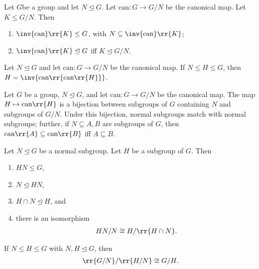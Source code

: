 \documentclass{article}
\begin{document}
\begin{proposition}
  Let $G$be a group and let $N\trianglelefteq G$. Let $\text{can}:G\to G/N$ be the canonical
  map. Let $K\leq G/N$. Then
  \begin{enumerate}
    \item $\inv{\text{can}}\rr{K}\leq G$, with $N\subseteq\inv{\text{can}}\rr{K}$;
    \item $\inv{\text{can}}\rr{K}\trianglelefteq G$ iff $K\trianglelefteq G/N$.
  \end{enumerate}
\end{proposition}

\begin{proposition}
  Let $N\trianglelefteq G$ and let $\text{can}:G\to G/N$ be the canonical map. If $N\leq H\leq G$,
  then $H=\inv{\text{can}\rr{\text{can}\rr{H}}}$.
\end{proposition}

\begin{theorem}[Correspondence]
  \label{thm:correspondence}
  Let $G$ be a group, $N\trianglelefteq G$, and let $\text{can}:G\to G/N$ be the canonical map.
  The map $H\mapsto\text{can}\rr{H}$ is a bijection between subgroups of $G$ containing $N$ and
  subgroups of $G/N$. Under this bijection, normal subgroups match with normal subgroups; further,
  if $N\subseteq A,B$ are subgroups of $G$, then $\text{can}\rr{A}\subseteq\text{can}\rr{B}$
  iff $A\subseteq B$.
\end{theorem}

\begin{theorem}
  \label{thm:second-iso-theorem}
  Let $N\trianglelefteq G$ be a normal subgroup. Let $H$ be a subgroup of $G$. Then
  \begin{enumerate}
    \item $HN\leq G$,
    \item $N\trianglelefteq HN$,
    \item $H\cap N\trianglelefteq H$, and
    \item there is an isomorphism \begin{align*}
        HN/N \cong H/\rr{H\cap N}.
      \end{align*}
  \end{enumerate}
\end{theorem}

\begin{theorem}
  \label{thm:third-iso-theorem}
  If $N\leq H\leq G$ with $N,H\trianglelefteq G$, then \begin{align*}
    \rr{G/N}/\rr{H/N}\cong G/H.
  \end{align*}
\end{theorem}
\end{document}
